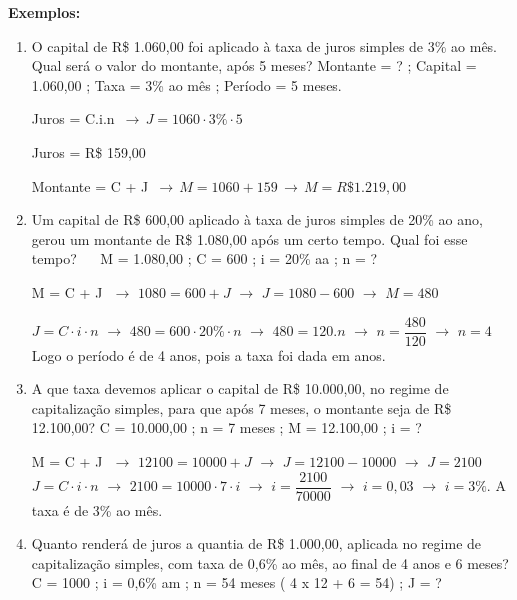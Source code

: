 \begin{multicols*}{2}
		\textbf{Exemplos:}
	
		\begin{enumerate}
		
		\item O capital de R\$ 1.060,00 foi aplicado à taxa de juros simples de 3\% ao mês. Qual será o valor do montante, após 5 meses?		Montante = ?  ;  Capital = 1.060,00  ;  Taxa = 3\% ao mês  ;  Período = 5 meses.
		
		Juros = C.i.n  $\, \rightarrow \,  J = 1060 \cdot 3\% \cdot 5$
		
		Juros = R\$ 159,00
		
		Montante = C + J $ \, \rightarrow \, M = 1060 + 159 \, \rightarrow \, M = R\$1.219,00$
		
		\item Um capital de R\$ 600,00 aplicado à taxa de juros simples de 20\% ao ano, gerou  um  montante  de R\$ 1.080,00 após um certo tempo. Qual foi esse tempo?  $\, \, \, \, \, \, $  M = 1.080,00 ; C = 600 ; i = 20\% aa ; n = ?
		
		M = C + J $\, \, \rightarrow \, \,  1080 = 600 + J \, \, \rightarrow \, \, J = 1080 - 600 \, \, \rightarrow \, \, M= 480$
		
		$ J = C\cdot i \cdot n \, \, \rightarrow \, \, 480 = 600 \cdot 20\% \cdot n \, \, \rightarrow \, \, 480 = 120.n \, \, \rightarrow \, \, n = \dfrac{480}{120}\, \, \rightarrow \, \, n = 4 $ Logo o período é de 4 anos, pois a taxa foi dada em anos.
		
		\item A que taxa devemos aplicar o capital de R\$ 10.000,00, no regime de capitalização simples, para que após 7 meses, o montante seja de R\$ 12.100,00?  C = 10.000,00  ;  n = 7 meses  ;  M = 12.100,00 ;  i = ?
		
		M = C + J $\, \, \rightarrow \, \, 12100 = 10000 + J \, \, \rightarrow \, \, J = 12100 - 10000 \, \, \rightarrow \, \, J = 2100$\\
		
		$ J = C \cdot i \cdot n \, \, \rightarrow \, \,2100 = 10000 \cdot 7 \cdot i \, \, \rightarrow \, \, i = \dfrac{2100}{70000} \, \, \rightarrow \, \, i = 0,03 \, \, \rightarrow \, \, i = 3\% $. A taxa é de 3\% ao mês.
		
		\item Quanto renderá de juros a quantia de R\$ 1.000,00, aplicada no regime de capitalização simples, com taxa de 0,6\% ao mês, ao final de 4 anos e 6 meses? C = 1000 ; i = 0,6\% am ; n = 54 meses ( 4 x 12 + 6 = 54) ; J = ?
		

\end{enumerate}
\end{multicols*}

